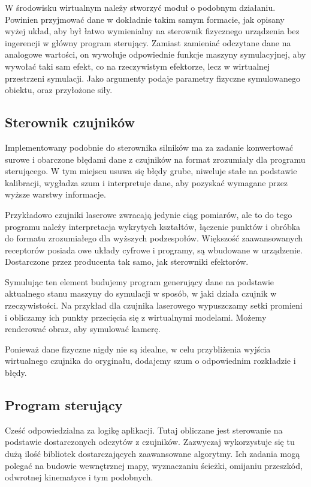 W środowisku wirtualnym należy stworzyć moduł o podobnym działaniu.
Powinien przyjmować dane w dokładnie takim samym formacie, jak opisany wyżej układ, aby był łatwo wymienialny na sterownik fizycznego urządzenia bez ingerencji w główny program sterujący.
Zamiast zamieniać odczytane dane na analogowe wartości, on wywołuje odpowiednie funkcje maszyny symulacyjnej, aby wywołać taki sam efekt, co na rzeczywistym efektorze, lecz w wirtualnej przestrzeni symulacji.
Jako argumenty podaje parametry fizyczne symulowanego obiektu, oraz przyłożone siły.
 

\subsection{Sterownik czujników}
Implementowany podobnie do sterownika silników ma za zadanie konwertować surowe i obarczone błędami dane z czujników na format zrozumiały dla programu sterującego.
W tym miejscu usuwa się błędy grube, niweluje stałe na podstawie kalibracji, wygładza szum i interpretuje dane, aby pozyskać wymagane przez wyższe warstwy informacje.

Przykładowo czujniki laserowe zwracają jedynie ciąg pomiarów, ale to do tego programu należy interpretacja wykrytych kształtów, łączenie punktów i obróbka do formatu zrozumiałego dla wyższych podzespołów.
Większość zaawansowanych receptorów posiada owe układy cyfrowe i programy, są wbudowane w urządzenie.
Dostarczone przez producenta tak samo, jak sterowniki efektorów.
 
Symulując ten element budujemy program generujący dane na podstawie aktualnego stanu maszyny do symulacji w sposób, w jaki działa czujnik w rzeczywistości.
Na przykład dla czujnika laserowego wypuszczamy setki promieni i obliczamy ich punkty przecięcia się z wirtualnymi modelami.
Możemy renderować obraz, aby symulować kamerę.

Ponieważ dane fizyczne nigdy nie są idealne, w celu przybliżenia wyjścia wirtualnego czujnika do oryginału, dodajemy szum o odpowiednim rozkładzie i błędy.

\subsection{Program sterujący}
Cześć odpowiedzialna za logikę aplikacji. Tutaj obliczane jest sterowanie na podstawie dostarczonych odczytów z czujników.
Zazwyczaj wykorzystuje się tu dużą ilość bibliotek dostarczających zaawansowane algorytmy.
Ich zadania mogą polegać na budowie wewnętrznej mapy, wyznaczaniu ścieżki, omijaniu przeszkód, odwrotnej kinematyce i tym podobnych.


